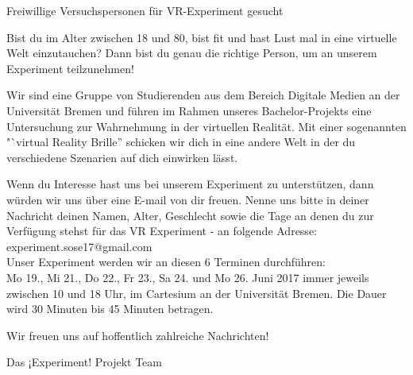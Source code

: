\documentclass{Bericht}
\begin{document}
\begin{changemargin}[25	pt]{0pt}

Freiwillige Versuchspersonen für VR-Experiment gesucht

Bist du im Alter zwischen 18 und 80, bist fit und hast Lust mal in eine virtuelle Welt einzutauchen? Dann bist du genau die richtige Person, um an unserem Experiment teilzunehmen!

Wir sind eine Gruppe von Studierenden aus dem Bereich Digitale Medien an der Universität Bremen und führen im Rahmen unseres Bachelor-Projekts eine Untersuchung zur Wahrnehmung in der virtuellen Realität. Mit einer sogenannten "`virtual Reality Brille'' schicken wir dich in eine andere Welt in der du verschiedene Szenarien auf dich einwirken lässt.

Wenn du Interesse hast uns bei unserem Experiment zu unterstützen, dann würden wir uns über eine E-mail von dir freuen. Nenne uns bitte in deiner Nachricht deinen Namen, Alter, Geschlecht sowie die Tage an denen du zur Verfügung stehst für das VR Experiment - an folgende Adresse: experiment.sose17@gmail.com \\

Unser Experiment werden wir an diesen 6 Terminen durchführen: \\

Mo 19., Mi 21., Do 22., Fr 23., Sa 24. und Mo 26. Juni 2017 immer jeweils zwischen 10 und 18 Uhr, im Cartesium an der Universität Bremen. Die Dauer wird 30 Minuten bis 45 Minuten betragen.

Wir freuen uns auf hoffentlich zahlreiche Nachrichten!

Das ¡Experiment! Projekt Team

\end{changemargin}
\end{document}
